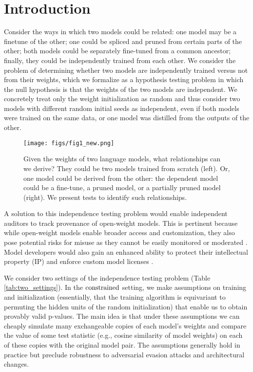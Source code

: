 \section{Introduction}

Consider the ways in which two models could be related: one model may be a finetune of the other; one could be spliced and pruned from certain parts of the other; both models could be separately fine-tuned from a common ancestor; finally, they could be independently trained from each other. 
We consider the problem of determining whether two models are independently trained versus not from their weights, which we formalize as a hypothesis testing problem in which the null hypothesis is that the weights of the two models are independent. We concretely treat only the weight initialization as random and thus consider two models with different random initial seeds as independent, even if both models were trained on the same data, or one model was distilled from the outputs of the other.

\begin{figure}[t]
    \centering
    \texttt{[image: figs/fig1\_new.png]}
    \caption{Given the weights of two language models, what relationships can we derive? They could be two models trained from scratch (left). Or, one model could be derived from the other: the dependent model could be a fine-tune, a pruned model, or a partially pruned model (right). We present tests to identify such relationships. 
    }
    \label{fig:figure1}
\end{figure}

A solution to this independence testing problem would enable independent auditors to track provenance of open-weight models. This is pertinent because while open-weight models enable broader access and customization, they also pose potential risks for misuse as they cannot be easily monitored or moderated \citep{kapoor2024openmodels}.
Model developers would also gain an enhanced ability to protect their intellectual property (IP) \citep{2024miquscandal, Peng2023dnnip} and enforce custom model licenses \citep{dubey2024llama3herdmodels,deepseekai2024deepseekv3technicalreport}. 

We consider two settings of the independence testing problem (Table \ref{tab:two_settings}).
In the $\textup{constrained}$ setting, we make assumptions on training and initialization (essentially, that the training algorithm is equivariant to permuting the hidden units of the random initialization)
that enable us to obtain provably valid p-values. 
The main idea is that under these assumptions we can cheaply simulate many exchangeable copies of each model's weights and compare the value of some test statistic (e.g., cosine similarity of model weights) on each of these copies with the original model pair.
The assumptions generally hold in practice but preclude robustness to adversarial evasion attacks and architectural changes.


